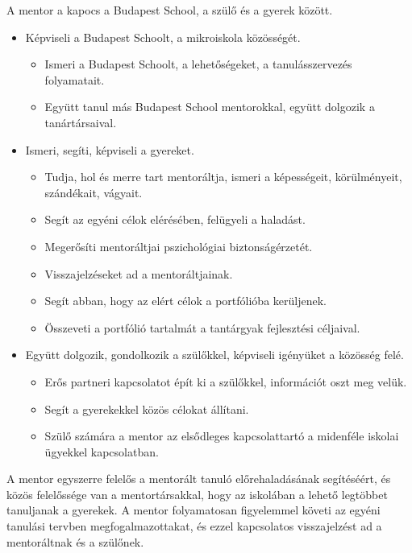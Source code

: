   A mentor a kapocs a Budapest School, a szülő és a gyerek között.

  \begin{itemize}
   \item Képviseli a Budapest Schoolt, a mikroiskola közösségét.
    \begin{itemize}
      \item Ismeri a Budapest Schoolt, a lehetőségeket, a tanulásszervezés folyamatait.
      \item Együtt tanul más Budapest School mentorokkal, együtt dolgozik a tanártársaival.
   \end{itemize}

  \item Ismeri, segíti, képviseli a gyereket.
  \begin{itemize}
    \item  Tudja, hol és merre tart mentoráltja, ismeri a képességeit, körülményeit, szándékait, vágyait.
    \item    Segít az egyéni célok elérésében, felügyeli a haladást.
    \item    Megerősíti mentoráltjai pszichológiai biztonságérzetét.
    \item   Visszajelzéseket ad a mentoráltjainak.
    \item    Segít abban, hogy az elért célok a portfólióba kerüljenek.
    \item    Összeveti a portfólió tartalmát a tantárgyak fejlesztési céljaival.
  \end{itemize}

  \item Együtt dolgozik, gondolkozik a szülőkkel, képviseli igényüket a közösség felé.
  \begin{itemize}
    \item Erős partneri kapcsolatot épít ki a szülőkkel, információt oszt meg velük.
    \item Segít a gyerekekkel közös célokat állítani.
    \item Szülő számára a mentor az elsődleges kapcsolattartó a midenféle iskolai ügyekkel kapcsolatban.
  \end{itemize}

\end{itemize}

  A mentor egyszerre felelős a mentorált tanuló előrehaladásának segítéséért, és
  közös felelőssége van a mentortársakkal, hogy az iskolában a lehető legtöbbet
  tanuljanak a gyerekek. A mentor folyamatosan figyelemmel követi az egyéni
  tanulási tervben megfogalmazottakat, és ezzel kapcsolatos visszajelzést ad a
  mentoráltnak és a szülőnek.


